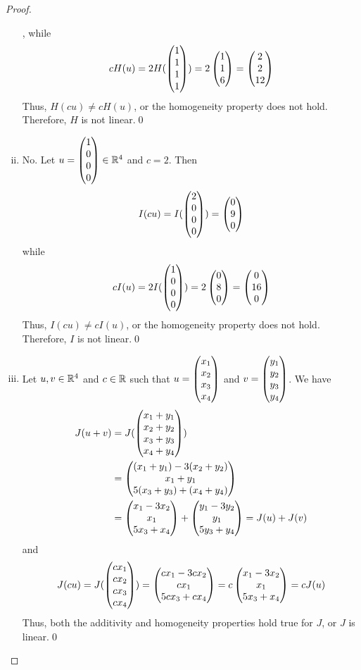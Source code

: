 \begin{proof}
\begin{enumerate}[(i)]
\[        \]
        , while 
        \[
            \begin{aligned}
                cH(u) = 2H(\begin{pmatrix} 1\\ 1\\1 \\ 1\end{pmatrix})
                      = 2 \begin{pmatrix} 1\\ 1\\ 6\end{pmatrix} = \begin{pmatrix} 2\\ 2\\ 12\end{pmatrix}
            \end{aligned}
        \]
        Thus, $H(cu)\not=cH(u)$, or the homogeneity property does not hold. Therefore, $H$ is not linear.\qed
        \item No. Let $u=\begin{pmatrix} 1\\ 0\\0 \\ 0\end{pmatrix}\in\mathbb R^4$ and $c=2$. Then 
        \[
            \begin{aligned}
                I(cu)=I(\begin{pmatrix} 2\\ 0\\0 \\ 0\end{pmatrix})=\begin{pmatrix} 0\\ 9\\ 0\end{pmatrix}
            \end{aligned}
        \]
        while 
        \[
            \begin{aligned}
                cI(u)=2I(\begin{pmatrix} 1\\ 0\\0 \\ 0\end{pmatrix})=2\begin{pmatrix} 0\\ 8\\ 0\end{pmatrix}=\begin{pmatrix} 0\\ 16\\ 0\end{pmatrix}
            \end{aligned}
        \]
        Thus, $I(cu)\not=cI(u)$, or the homogeneity property does not hold. Therefore, $I$ is not linear.\qed
        \item Let $u,v\in\mathbb R^4$ and $c\in\mathbb R$ such that $u=\begin{pmatrix} x_1\\ x_2\\x_3 \\ x_4\end{pmatrix}$ and $v=\begin{pmatrix} y_1\\ y_2\\y_3 \\ y_4\end{pmatrix}$. We have 
        \[
            \begin{aligned}
                J(u+v)&=J(\begin{pmatrix} x_1+y_1\\ x_2+y_2\\x_3+y_3 \\ x_4+y_4\end{pmatrix})\\
                &=\begin{pmatrix} (x_1+y_1)-3(x_2+y_2)\\ x_1+y_1\\ 5(x_3+y_3)+(x_4+y_4)\end{pmatrix}\\
                &=\begin{pmatrix} x_1-3x_2\\ x_1\\ 5x_3+x_4\end{pmatrix}+\begin{pmatrix} y_1-3y_2\\ y_1\\ 5y_3+y_4\end{pmatrix}=J(u)+J(v)
            \end{aligned}
        \]
        and 
        \[
            \begin{aligned}
                J(cu)=J(\begin{pmatrix} cx_1\\ cx_2\\cx_3 \\ cx_4\end{pmatrix})
                =\begin{pmatrix} cx_1-3cx_2\\ cx_1\\ 5cx_3+cx_4\end{pmatrix}
                =c \begin{pmatrix} x_1-3x_2\\ x_1\\ 5x_3+x_4\end{pmatrix}
                =cJ(u)
            \end{aligned}
        \]
        Thus, both the additivity and homogeneity properties hold true for $J$, or $J$ is linear.\qed
    \end{enumerate}
    
    \renewcommand{\qedsymbol}{}
\end{proof}